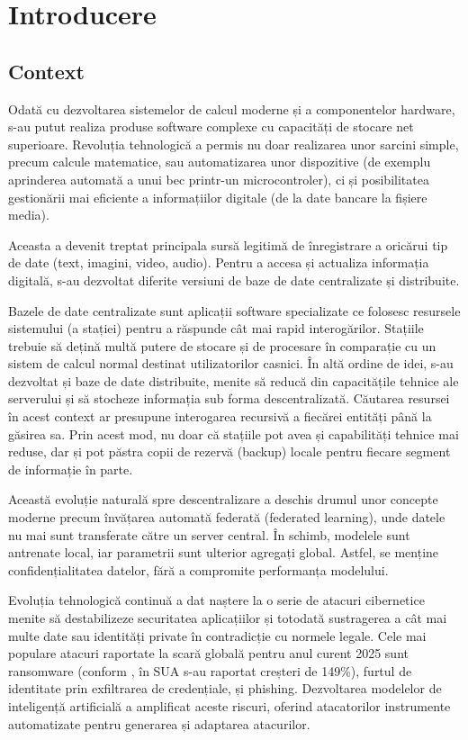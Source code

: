 \documentclass[../../main.tex]{subfiles}
\begin{document}
\chapter{Introducere}

\section{Context}

Odată cu dezvoltarea sistemelor de calcul moderne și a componentelor hardware, s-au putut realiza produse software complexe cu capacități de stocare
net superioare. Revoluția tehnologică a permis nu doar realizarea unor sarcini simple, precum calcule matematice, sau automatizarea unor dispozitive (de exemplu aprinderea automată a unui bec printr-un microcontroler),
ci și posibilitatea gestionării mai eficiente a informațiilor digitale (de la date bancare la fișiere media).

Aceasta a devenit treptat principala sursă legitimă de înregistrare a oricărui tip de date (text, imagini, video, audio).
Pentru a accesa și actualiza informația digitală, s-au dezvoltat diferite versiuni de baze de date centralizate și distribuite.

Bazele de date centralizate sunt aplicații software specializate ce folosesc resursele sistemului (a stației) pentru a răspunde cât mai rapid interogărilor.
Stațiile trebuie să dețină multă putere de stocare și de procesare în comparație cu un sistem de calcul normal destinat utilizatorilor casnici.
În altă ordine de idei, s-au dezvoltat și baze de date distribuite, menite să reducă din capacitățile tehnice ale serverului și să stocheze informația sub
forma descentralizată. Căutarea resursei în acest context ar presupune interogarea recursivă a fiecărei entități până la găsirea sa. Prin acest mod, nu doar
că stațiile pot avea și capabilități tehnice mai reduse, dar și pot păstra copii de rezervă (backup) locale pentru fiecare segment de informație în parte.

Această evoluție naturală spre descentralizare a deschis drumul unor concepte moderne precum învățarea automată federată (federated learning), unde datele nu mai sunt transferate către un server central. În schimb, modelele sunt antrenate local, iar parametrii sunt ulterior agregați global. Astfel, se menține confidențialitatea datelor, fără a compromite performanța modelului.

Evoluția tehnologică continuă a dat naștere la o serie de atacuri cibernetice menite să destabilizeze securitatea aplicațiilor și totodată sustragerea a
cât mai multe date sau identități private în contradicție cu normele legale.
Cele mai populare atacuri raportate la scară globală pentru anul curent 2025 sunt ransomware (conform \cite{dnsc_buletin_2025}, în SUA s-au raportat creșteri
de 149\%), furtul de identitate prin exfiltrarea de credențiale, și phishing.
Dezvoltarea modelelor de inteligență artificială a amplificat aceste riscuri, oferind atacatorilor instrumente automatizate pentru generarea și adaptarea atacurilor.
\end{document}
